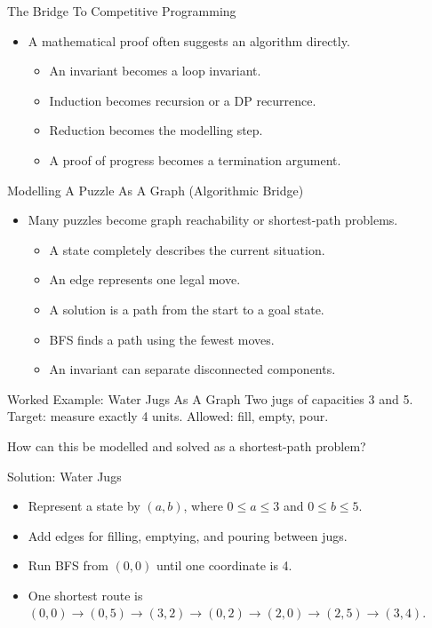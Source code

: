 \documentclass{beamer}
\begin{document}
\begin{frame}{The Bridge To Competitive Programming}
    \pause
    \begin{itemize}
        \item A mathematical proof often suggests an algorithm directly.
            \begin{itemize}
                \item An invariant becomes a loop invariant.
                \item Induction becomes recursion or a DP recurrence.
                \item Reduction becomes the modelling step.
                \item A proof of progress becomes a termination argument.
            \end{itemize}
    \end{itemize}
\end{frame}

\begin{frame}{Modelling A Puzzle As A Graph (Algorithmic Bridge)}
    \pause
    \begin{itemize}
        \item Many puzzles become graph reachability or shortest-path problems.
            \begin{itemize}
                \item A state completely describes the current situation.
                \item An edge represents one legal move.
                \item A solution is a path from the start to a goal state.
                \item BFS finds a path using the fewest moves.
                \item An invariant can separate disconnected components.
            \end{itemize}
    \end{itemize}
\end{frame}

\begin{frame}{Worked Example: Water Jugs As A Graph}
    Two jugs of capacities 3 and 5. Target: measure exactly 4 units.
    Allowed: fill, empty, pour.

    How can this be modelled and solved as a shortest-path problem?
\end{frame}

\begin{frame}{Solution: Water Jugs}
    \pause
    \begin{itemize}
        \item Represent a state by $(a,b)$, where
            $0\le a\le3$ and $0\le b\le5$.
        \item Add edges for filling, emptying, and pouring between jugs.
        \item Run BFS from $(0,0)$ until one coordinate is 4.
        \item One shortest route is
            $(0,0)\to(0,5)\to(3,2)\to(0,2)\to(2,0)\to(2,5)\to(3,4)$.
    \end{itemize}
\end{frame}
\end{document}
